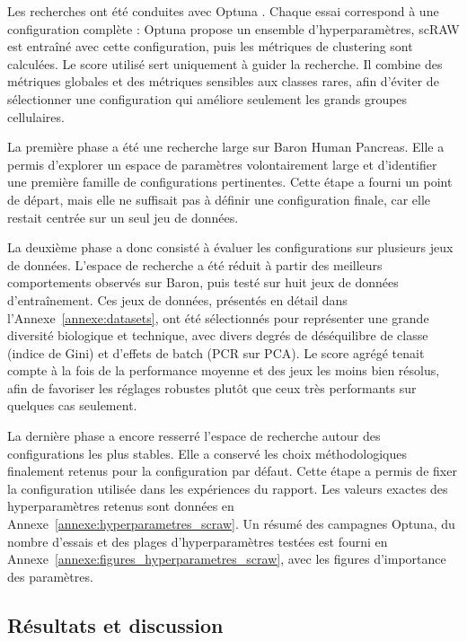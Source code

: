 Les recherches ont été conduites avec Optuna \cite{akiba2019optuna}. Chaque essai correspond à une configuration complète : Optuna propose un ensemble d'hyperparamètres, scRAW est entraîné avec cette configuration, puis les métriques de clustering sont calculées. Le score utilisé sert uniquement à guider la recherche. Il combine des métriques globales et des métriques sensibles aux classes rares, afin d'éviter de sélectionner une configuration qui améliore seulement les grands groupes cellulaires.

La première phase a été une recherche large sur Baron Human Pancreas. Elle a permis d'explorer un espace de paramètres volontairement large et d'identifier une première famille de configurations pertinentes. Cette étape a fourni un point de départ, mais elle ne suffisait pas à définir une configuration finale, car elle restait centrée sur un seul jeu de données.

La deuxième phase a donc consisté à évaluer les configurations sur plusieurs jeux de données. L'espace de recherche a été réduit à partir des meilleurs comportements observés sur Baron, puis testé sur huit jeux de données d'entraînement. Ces jeux de données, présentés en détail dans l'Annexe~\ref{annexe:datasets}, ont été sélectionnés pour représenter une grande diversité biologique et technique, avec divers degrés de déséquilibre de classe (indice de Gini) et d'effets de batch (PCR sur PCA). Le score agrégé tenait compte à la fois de la performance moyenne et des jeux les moins bien résolus, afin de favoriser les réglages robustes plutôt que ceux très performants sur quelques cas seulement.

La dernière phase a encore resserré l'espace de recherche autour des configurations les plus stables. Elle a conservé les choix méthodologiques finalement retenus pour la configuration par défaut. Cette étape a permis de fixer la configuration utilisée dans les expériences du rapport. Les valeurs exactes des hyperparamètres retenus sont données en Annexe~\ref{annexe:hyperparametres_scraw}. Un résumé des campagnes Optuna, du nombre d'essais et des plages d'hyperparamètres testées est fourni en Annexe~\ref{annexe:figures_hyperparametres_scraw}, avec les figures d'importance des paramètres.

\subsection{Résultats et discussion}

